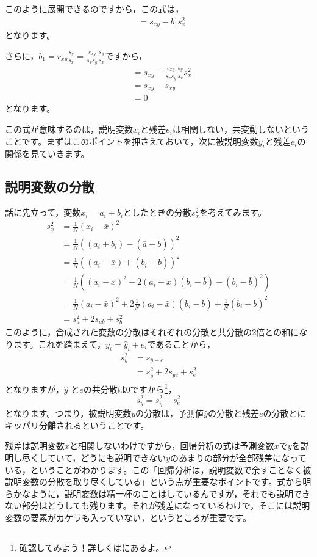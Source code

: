 \documentclass{ltjbook}
\begin{document}
このように展開できるのですから，この式は，
\begin{align}
	&= s_{xy} - b_1 s_{x}^2
\end{align}
となります。

さらに，$b_1 = r_{xy}\frac{s_y}{s_x} = \frac{s_{xy}}{s_xs_y} \frac{s_y}{s_x}$ですから，
\begin{align}
	&= s_{xy} - \frac{s_{xy}}{s_xs_y} \frac{s_y}{s_x}s_{x}^2\\
	&= s_{xy} - s_{xy} \\
	&= 0
\end{align}
となります。

この式が意味するのは，説明変数$x_i$と残差$e_i$は相関しない，共変動しないということです。まずはこのポイントを押さえておいて，次に被説明変数$y_i$と残差$e_i$の関係を見ていきます。

\subsection{説明変数の分散}
話に先立って，変数$x_i = a_i+b_i$としたときの分散$s_x^2$を考えてみます。
\begin{align}
s_x^2 &= \frac{1}{N}(x_i - \bar{x})^2\\
&= \frac{1}{N}((a_i + b_i) - (\bar{a} + \bar{b}))^2\\
&= \frac{1}{N}((a_i - \bar{x}) + (b_i - \bar{b}))^2\\
&= \frac{1}{N}((a_i - \bar{x})^2 + 2(a_i - \bar{x})(b_i - \bar{b}) + (b_i - \bar{b})^2)\\
&= \frac{1}{N}(a_i - \bar{x})^2 + 2\frac{1}{N}(a_i - \bar{x})(b_i - \bar{b})  + \frac{1}{N}(b_i - \bar{b})^2\\
&= s_a^2 + 2s_{ab} + s_b^2
\end{align}
このように，合成された変数の分散はそれぞれの分散と共分散の2倍との和になります。これを踏まえて，$y_i = \hat{y}_i + e_i$であることから，
\begin{align}
	s_{y}^2 &= s_{\hat{y}+e}\\
	& = s_{\hat{y}}^2 + 2s_{\hat{y}e} + s_e^2
\end{align}
となりますが，$\hat{y}$ と$e$の共分散は$0$ですから\footnote{確認してみよう！詳しくは\textcite{kosugi2018}にあるよ。}，
\[ s_y^2 = s_{\hat{y}}^2 + s_e^2 \]
となります。つまり，被説明変数$y$の分散は，予測値$\hat{y}$の分散と残差$e$の分散とにキッパリ分離されるということです。

残差は説明変数$x$と相関しないわけですから，回帰分析の式は予測変数$x$で$y$を説明し尽くしていて，どうにも説明できない$y$のあまりの部分が全部残差になっている，ということがわかります。この「回帰分析は，説明変数で余すことなく被説明変数の分散を取り尽くしている」という点が重要なポイントです。式から明らかなように，説明変数は精一杯のことはしているんですが，それでも説明できない部分はどうしても残ります。それが残差になっているわけで，そこには説明変数の要素がカケラも入っていない，というところが重要です。
\end{document}
